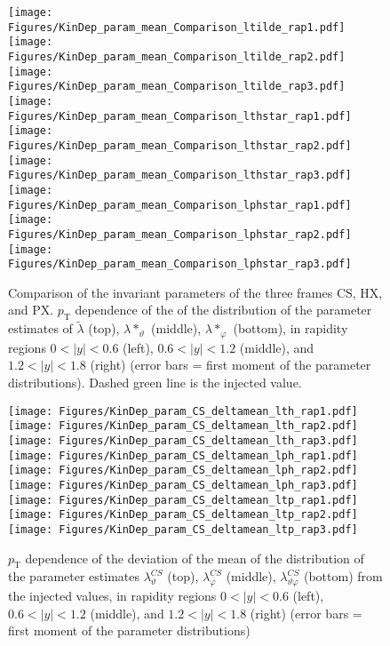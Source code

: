\documentclass[12pt]{article}
\newcommand{\pT}{p_\mathrm{T}}
\newcommand{\absy}{\left |  y \right |}
\newcommand{\lamtilde}{\tilde{\lambda}}
\newcommand{\lamthstar}{\lambda*_\vartheta}
\newcommand{\lamphstar}{\lambda*_\varphi}
\newcommand{\lamthCS}{\lambda^{\scriptscriptstyle CS}_\vartheta}
\newcommand{\lamphCS}{\lambda^{\scriptscriptstyle CS}_\varphi}
\newcommand{\lamthphCS}{\lambda^{\scriptscriptstyle CS}_{\vartheta \varphi}}
\begin{document}




\begin{figure}[htbp]
\centering
\texttt{[image: Figures/KinDep\_param\_mean\_Comparison\_ltilde\_rap1.pdf]}
\texttt{[image: Figures/KinDep\_param\_mean\_Comparison\_ltilde\_rap2.pdf]}
\texttt{[image: Figures/KinDep\_param\_mean\_Comparison\_ltilde\_rap3.pdf]}
\texttt{[image: Figures/KinDep\_param\_mean\_Comparison\_lthstar\_rap1.pdf]}
\texttt{[image: Figures/KinDep\_param\_mean\_Comparison\_lthstar\_rap2.pdf]}
\texttt{[image: Figures/KinDep\_param\_mean\_Comparison\_lthstar\_rap3.pdf]}
\texttt{[image: Figures/KinDep\_param\_mean\_Comparison\_lphstar\_rap1.pdf]}
\texttt{[image: Figures/KinDep\_param\_mean\_Comparison\_lphstar\_rap2.pdf]}
\texttt{[image: Figures/KinDep\_param\_mean\_Comparison\_lphstar\_rap3.pdf]}
\caption{Comparison of the invariant parameters of the three frames CS, HX,
and PX. $\pT$ dependence of the of the distribution of the
parameter estimates of $\lamtilde$ (top), $\lamthstar$ (middle), $\lamphstar$ (bottom), in rapidity regions $0<\absy<0.6$ (left), 
$0.6<\absy<1.2$ (middle), and $1.2<\absy<1.8$ (right) (error bars = first moment of the parameter
distributions). Dashed green line is the injected value.}
\end{figure}
\clearpage











\begin{figure}[htbp]
\centering
\texttt{[image: Figures/KinDep\_param\_CS\_deltamean\_lth\_rap1.pdf]}
\texttt{[image: Figures/KinDep\_param\_CS\_deltamean\_lth\_rap2.pdf]}
\texttt{[image: Figures/KinDep\_param\_CS\_deltamean\_lth\_rap3.pdf]}
\texttt{[image: Figures/KinDep\_param\_CS\_deltamean\_lph\_rap1.pdf]}
\texttt{[image: Figures/KinDep\_param\_CS\_deltamean\_lph\_rap2.pdf]}
\texttt{[image: Figures/KinDep\_param\_CS\_deltamean\_lph\_rap3.pdf]}
\texttt{[image: Figures/KinDep\_param\_CS\_deltamean\_ltp\_rap1.pdf]}
\texttt{[image: Figures/KinDep\_param\_CS\_deltamean\_ltp\_rap2.pdf]}
\texttt{[image: Figures/KinDep\_param\_CS\_deltamean\_ltp\_rap3.pdf]}
\caption{$\pT$ dependence of the deviation of the mean of the distribution of
the parameter estimates $\lamthCS$ (top), $\lamphCS$ (middle), $\lamthphCS$
(bottom) from the injected values, in rapidity regions $0<\absy<0.6$ (left), 
$0.6<\absy<1.2$ (middle), and $1.2<\absy<1.8$ (right) (error bars = first moment of the parameter
distributions)}
\end{figure}
\clearpage
\end{document}
